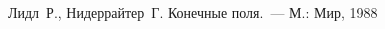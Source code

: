 \clearpage
\begin{thebibliography}{9}

Лидл~Р., Нидеррайтер~Г. Конечные поля.~--- М.: Мир, 1988
\end{thebibliography}
